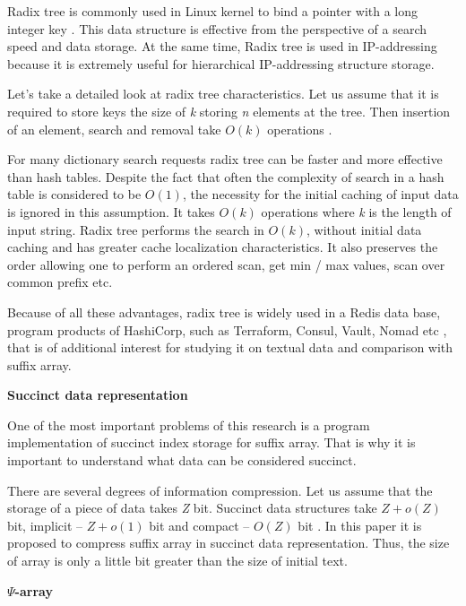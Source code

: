 Radix tree is commonly used in Linux kernel to bind a pointer with a long integer key \cite{Linux2018}.
This data structure is effective from the perspective of a search speed and data storage.
At the same time, Radix tree is used in IP-addressing because it is extremely useful for
hierarchical IP-addressing structure \cite{Radix2019} storage.

Let's take a detailed look at radix tree characteristics. Let us assume that it is required
to store keys the size of \emph{k} storing \emph{n} elements at the tree. Then insertion of an element,
search and removal take $O(k)$ operations \cite{leis2013adaptive}.

For many dictionary search requests radix tree can be faster and more effective than hash tables.
Despite the fact that often the complexity of search in a hash table is considered to be $O(1)$,
the necessity for the initial caching of input data is ignored in this assumption.
It takes $O(k)$ operations where \emph{k} is the length of input string.
Radix tree performs the search in $O(k)$, without initial data caching and has greater
cache localization characteristics.
It also preserves the order allowing one to perform an ordered scan,
get min / max values, scan over common prefix etc.

Because of all these advantages, radix tree is widely used in a Redis data base, program
products of HashiCorp, such as Terraform, Consul, Vault, Nomad etc \cite{Redis2018},
that is of additional interest for studying it on textual data and comparison with suffix array.

\textbf{Succinct data representation}

One of the most important problems of this research is
a program implementation of succinct index storage for suffix array.
That is why it is important to understand what data can be considered succinct.

There are several degrees of information compression.
Let us assume that the storage of a piece of data takes \emph{Z} bit.
Succinct data structures take \(Z + o(Z)\) bit, implicit -- \(Z + o(1)\) bit and
compact -- \(O(Z)\) bit \cite{huo2014practical}. In this paper it is proposed to
compress suffix array in succinct data representation.
Thus, the size of array is only a little bit greater than the size of initial text.

\textbf{$\Psi$-array}


